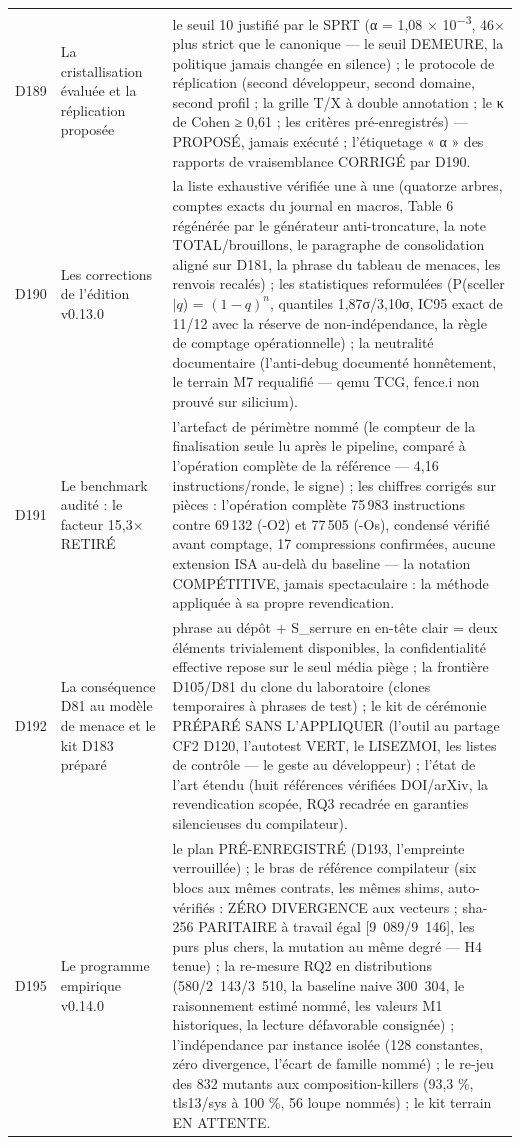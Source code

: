 \begin{longtable}{@{}p{1.6cm} p{4.6cm} >{\raggedright\arraybackslash}p{9.5cm}@{}}
D189 & La cristallisation évaluée et la réplication proposée & le seuil
10 justifié par le SPRT (α = 1,08 × 10\textsuperscript{−3}, 46× plus
strict que le canonique — le seuil DEMEURE, la politique jamais changée
en silence) ; le protocole de réplication (second développeur, second
domaine, second profil ; la grille T/X à double annotation ; le κ de
Cohen ≥ 0,61 ; les critères pré-enregistrés) — PROPOSÉ, jamais exécuté ;
l'étiquetage « α » des rapports de vraisemblance CORRIGÉ par D190. \\
D190 & Les corrections de l'édition v0.13.0 & la liste exhaustive vérifiée une à une (quatorze arbres, comptes exacts du journal en macros, Table 6 régénérée par le générateur anti-troncature, la note TOTAL/brouillons, le paragraphe de consolidation aligné sur D181, la phrase du tableau de menaces, les renvois recalés) ; les statistiques reformulées (P(sceller$|q$) = $(1-q)^n$, quantiles 1,87σ/3,10σ, IC95 exact de 11/12 avec la réserve de non-indépendance, la règle de comptage opérationnelle) ; la neutralité documentaire (l'anti-debug documenté honnêtement, le terrain M7 requalifié — qemu TCG, fence.i non prouvé sur silicium). \\
D191 & Le benchmark audité : le facteur 15,3× RETIRÉ & l'artefact de périmètre nommé (le compteur de la finalisation seule lu après le pipeline, comparé à l'opération complète de la référence — 4,16 instructions/ronde, le signe) ; les chiffres corrigés sur pièces : l'opération complète 75\,983 instructions contre 69\,132 (-O2) et 77\,505 (-Os), condensé vérifié avant comptage, 17 compressions confirmées, aucune extension ISA au-delà du baseline — la notation COMPÉTITIVE, jamais spectaculaire : la méthode appliquée à sa propre revendication. \\
D192 & La conséquence D81 au modèle de menace et le kit D183 préparé & phrase au dépôt + S\_serrure en en-tête clair = deux éléments trivialement disponibles, la confidentialité effective repose sur le seul média piège ; la frontière D105/D81 du clone du laboratoire (clones temporaires à phrases de test) ; le kit de cérémonie PRÉPARÉ SANS L'APPLIQUER (l'outil au partage CF2 D120, l'autotest VERT, le LISEZMOI, les listes de contrôle — le geste au développeur) ; l'état de l'art étendu (huit références vérifiées DOI/arXiv, la revendication scopée, RQ3 recadrée en garanties silencieuses du compilateur). \\
D195 & Le programme empirique v0.14.0 & le plan PRÉ-ENREGISTRÉ (D193, l'empreinte verrouillée) ; le bras de référence compilateur (six blocs aux mêmes contrats, les mêmes shims, auto-vérifiés : ZÉRO DIVERGENCE aux vecteurs ; sha-256 PARITAIRE à travail égal [9~089/9~146], les purs plus chers, la mutation au même degré — H4 tenue) ; la re-mesure RQ2 en distributions (580/2~143/3~510, la baseline naive 300~304, le raisonnement estimé nommé, les valeurs M1 historiques, la lecture défavorable consignée) ; l'indépendance par instance isolée (128 constantes, zéro divergence, l'écart de famille nommé) ; le re-jeu des 832 mutants aux composition-killers (93,3 \%, tls13/sys à 100 \%, 56 loupe nommés) ; le kit terrain EN ATTENTE. \\
\end{longtable}